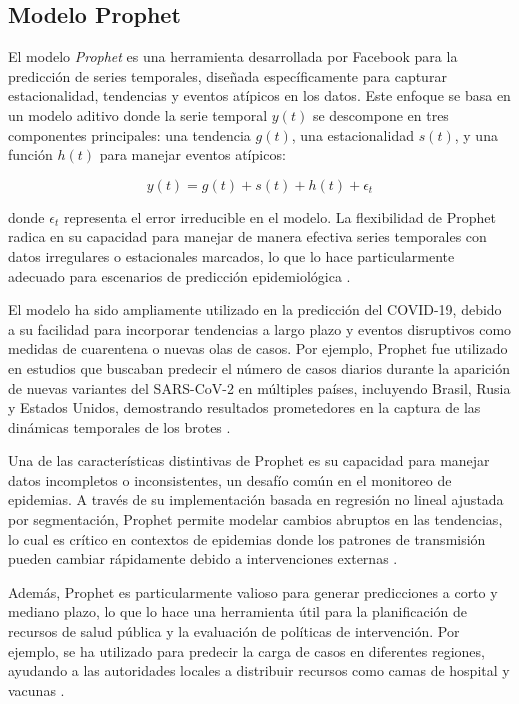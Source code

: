 \subsection{Modelo Prophet}\label{section:prophet-model}

El modelo \textit{Prophet} es una herramienta desarrollada por Facebook para la predicción de series temporales, diseñada específicamente para capturar estacionalidad, tendencias y eventos atípicos en los datos. Este enfoque se basa en un modelo aditivo donde la serie temporal \( y(t) \) se descompone en tres componentes principales: una tendencia \( g(t) \), una estacionalidad \( s(t) \), y una función \( h(t) \) para manejar eventos atípicos:

\[
y(t) = g(t) + s(t) + h(t) + \epsilon_t
\]

donde \( \epsilon_t \) representa el error irreducible en el modelo. La flexibilidad de Prophet radica en su capacidad para manejar de manera efectiva series temporales con datos irregulares o estacionales marcados, lo que lo hace particularmente adecuado para escenarios de predicción epidemiológica \cite{Baccega2024}.

El modelo ha sido ampliamente utilizado en la predicción del COVID-19, debido a su facilidad para incorporar tendencias a largo plazo y eventos disruptivos como medidas de cuarentena o nuevas olas de casos. Por ejemplo, Prophet fue utilizado en estudios que buscaban predecir el número de casos diarios durante la aparición de nuevas variantes del SARS-CoV-2 en múltiples países, incluyendo Brasil, Rusia y Estados Unidos, demostrando resultados prometedores en la captura de las dinámicas temporales de los brotes \cite{Baccega2024, AutoSEIR2020}.

Una de las características distintivas de Prophet es su capacidad para manejar datos incompletos o inconsistentes, un desafío común en el monitoreo de epidemias. A través de su implementación basada en regresión no lineal ajustada por segmentación, Prophet permite modelar cambios abruptos en las tendencias, lo cual es crítico en contextos de epidemias donde los patrones de transmisión pueden cambiar rápidamente debido a intervenciones externas \cite{Nguyen2023}.

Además, Prophet es particularmente valioso para generar predicciones a corto y mediano plazo, lo que lo hace una herramienta útil para la planificación de recursos de salud pública y la evaluación de políticas de intervención. Por ejemplo, se ha utilizado para predecir la carga de casos en diferentes regiones, ayudando a las autoridades locales a distribuir recursos como camas de hospital y vacunas \cite{Nguyen2023, Baccega2024}.

